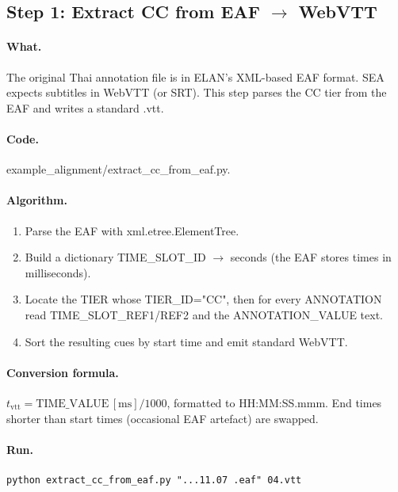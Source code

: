 \documentclass[11pt,a4paper]{article}
\def\texttt#1{#1}%
\begin{document}
\subsection{Step 1: Extract CC from EAF $\rightarrow$ WebVTT}
\label{sec:step1}

\paragraph{What.} The original Thai annotation file is in ELAN's XML-based
EAF format. SEA expects subtitles in WebVTT (or SRT). This step parses the
\texttt{CC} tier from the EAF and writes a standard \texttt{.vtt}.

\paragraph{Code.} \texttt{example\_alignment/extract\_cc\_from\_eaf.py}.

\paragraph{Algorithm.}
\begin{enumerate}[leftmargin=1.5em]
  \item Parse the EAF with \texttt{xml.etree.ElementTree}.
  \item Build a dictionary \texttt{TIME\_SLOT\_ID $\to$ seconds} (the EAF
        stores times in milliseconds).
  \item Locate the \texttt{TIER} whose \texttt{TIER\_ID="CC"}, then for every
        \texttt{ANNOTATION} read \texttt{TIME\_SLOT\_REF1/REF2} and the
        \texttt{ANNOTATION\_VALUE} text.
  \item Sort the resulting cues by start time and emit standard WebVTT.
\end{enumerate}

\paragraph{Conversion formula.}
$t_\text{vtt} = \mathrm{TIME\_VALUE}\,\mathrm{[ms]}/1000$, formatted to
\texttt{HH:MM:SS.mmm}. End times shorter than start times (occasional EAF
artefact) are swapped.

\paragraph{Run.}
\begin{lstlisting}
python extract_cc_from_eaf.py "...11.07 .eaf" 04.vtt
\end{lstlisting}
\end{document}
